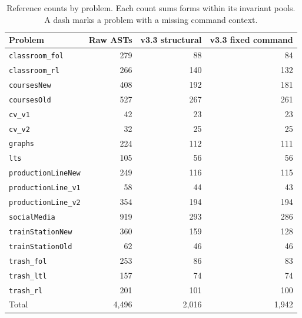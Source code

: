\begin{table}[H]\centering
\caption{Reference counts by problem. Each count sums forms within its invariant pools. A dash marks a problem with a missing command context.}
\label{tab:truth_metrics}\small\begin{tabular}{@{}lrrr@{}}\toprule
Problem & Raw ASTs & v3.3 structural & v3.3 fixed command\\\midrule
\texttt{classroom\_fol} & 279 & 88 & 84\\
\texttt{classroom\_rl} & 266 & 140 & 132\\
\texttt{coursesNew} & 408 & 192 & 181\\
\texttt{coursesOld} & 527 & 267 & 261\\
\texttt{cv\_v1} & 42 & 23 & 23\\
\texttt{cv\_v2} & 32 & 25 & 25\\
\texttt{graphs} & 224 & 112 & 111\\
\texttt{lts} & 105 & 56 & 56\\
\texttt{productionLineNew} & 249 & 116 & 115\\
\texttt{productionLine\_v1} & 58 & 44 & 43\\
\texttt{productionLine\_v2} & 354 & 194 & 194\\
\texttt{socialMedia} & 919 & 293 & 286\\
\texttt{trainStationNew} & 360 & 159 & 128\\
\texttt{trainStationOld} & 62 & 46 & 46\\
\texttt{trash\_fol} & 253 & 86 & 83\\
\texttt{trash\_ltl} & 157 & 74 & 74\\
\texttt{trash\_rl} & 201 & 101 & 100\\
\midrule
Total & 4,496 & 2,016 & 1,942\\
\bottomrule\end{tabular}\end{table}
